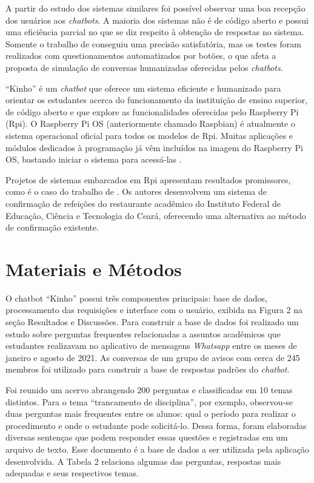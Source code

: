\documentclass[12pt]{article}
\begin{document}
A partir do estudo dos sistemas similares foi possível observar uma boa recepção dos usuários aos {\itshape chatbots}. A maioria dos sistemas não é de código aberto e possui uma eficiência parcial no que se diz respeito à obtenção de respostas no sistema. Somente o trabalho de \cite{silva:21} conseguiu uma precisão satisfatória, mas os testes foram realizados com questionamentos automatizados por botões, o que afeta a proposta de simulação de conversas humanizadas oferecidas pelos {\itshape chatbots}.

“Kinho” é um {\itshape chatbot} que oferece um sistema eficiente e humanizado para orientar os estudantes acerca do funcionamento da instituição de ensino superior, de código aberto e que explore as funcionalidades oferecidas pelo Raspberry Pi (Rpi). O Raspberry Pi OS (anteriormente chamado Raspbian) é atualmente o sistema operacional oficial para todos os modelos de Rpi. Muitas aplicações e módulos dedicados à programação já vêm incluídos na imagem do Raspberry Pi OS, bastando iniciar o sistema para acessá-las \cite{juca:18}.

Projetos de sistemas embarcados em Rpi apresentam resultados promissores, como é o caso do trabalho de \cite{junior:19}. Os autores desenvolvem um sistema de confirmação de refeições do restaurante acadêmico do Instituto Federal de Educação, Ciência e Tecnologia do Ceará, oferecendo uma alternativa ao método de confirmação existente. 

\section{Materiais e Métodos} \label{sec:firstpage}

O chatbot “Kinho” possui três componentes principais: base de dados, processamento das requisições e interface com o usuário, exibida na Figura 2 na seção Resultados e Discussões. Para construir a base de dados foi realizado um estudo sobre perguntas frequentes relacionadas a assuntos acadêmicos que estudantes realizavam no aplicativo de mensagens {\itshape Whatsapp} entre os meses de janeiro e agosto de 2021. As conversas de um grupo de avisos com cerca de 245 membros foi utilizado para construir a base de respostas padrões do {\itshape chatbot}.

Foi reunido um acervo abrangendo 200 perguntas e classificadas em 10 temas distintos. Para o tema “trancamento de disciplina”, por exemplo, observou-se duas perguntas mais frequentes entre os alunos: qual o período para realizar o procedimento e onde o estudante pode solicitá-lo. Dessa forma, foram elaboradas diversas sentenças que podem responder essas questões e registradas em um arquivo de texto. Esse documento é a base de dados a ser utilizada pela aplicação desenvolvida. A Tabela 2 relaciona algumas das perguntas, respostas mais adequadas e seus respectivos temas.
\end{document}
